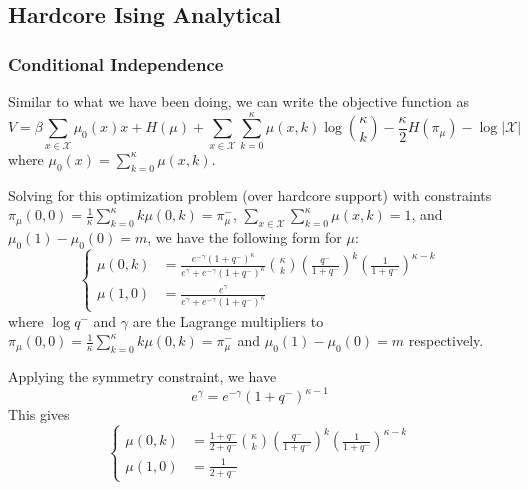 \documentclass[12pt]{article}
\numberwithin{equation}{section}
\begin{document}
\newpage

\subsection{Hardcore Ising Analytical}

\subsubsection{Conditional Independence}

Similar to what we have been doing, we can write the objective function as
\begin{equation*}
    V = \beta\sum_{x\in\mathcal{X}} \mu_0(x) x + H(\mu) + \sum_{x\in\mathcal{X}}\sum_{k=0}^\kappa \mu(x, k)\log{\kappa\choose k} - \frac\kappa2 H(\pi_\mu) - \log|\mathcal{X}|
\end{equation*}
where $\mu_0(x) = \sum_{k=0}^\kappa\mu(x, k)$.

Solving for this optimization problem (over hardcore support) with constraints
$\pi_\mu(0, 0) = \frac1\kappa\sum_{k=0}^\kappa k\mu(0, k) = \pi_\mu^-$, $\sum_{x\in\mathcal{X}}\sum_{k=0}^\kappa \mu(x, k)=1$, and $\mu_0(1) - \mu_0(0) = m$, we have the following form for $\mu$:
\begin{equation}
    \begin{cases}
        \mu(0, k) & = \displaystyle\frac{e^{-\gamma}(1+q^-)^\kappa}{e^\gamma + e^{-\gamma}(1+q^-)^\kappa}{\kappa\choose k}\left(\frac{q^-}{1+q^-}\right)^k\left(\frac{1}{1+q^-}\right)^{\kappa-k} \\
        \mu(1, 0) & = \displaystyle\frac{e^{\gamma}}{e^\gamma + e^{-\gamma}(1+q^-)^\kappa}
    \end{cases}
\end{equation}
where $\log q^-$ and $\gamma$ are the Lagrange multipliers to $\pi_\mu(0, 0) = \frac1\kappa\sum_{k=0}^\kappa k\mu(0, k) = \pi_\mu^-$ and $\mu_0(1) - \mu_0(0) = m$ respectively.

Applying the symmetry constraint, we have
\begin{equation}
    e^\gamma = e^{-\gamma}(1+q^-)^{\kappa-1}
\end{equation}
This gives
\begin{equation}
    \begin{cases}
        \mu(0, k) & = \displaystyle\frac{1+q^-}{2+q^-}{\kappa\choose k}\left(\frac{q^-}{1+q^-}\right)^k\left(\frac{1}{1+q^-}\right)^{\kappa-k} \\
        \mu(1, 0) & = \displaystyle\frac{1}{2+q^-}
    \end{cases}
    \label{Eq.HAIS-Q-SOL}
\end{equation}
\end{document}
